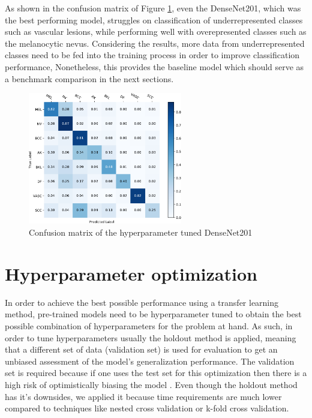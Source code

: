     As shown in the confusion matrix of Figure \ref{fig:densenet201_untuned_conf_matrix}, even the DenseNet201, which was the best performing model, struggles on classification of underrepresented classes such as vascular lesions, while performing well with overepresented classes such as the melanocytic nevus. Considering the results, more data from underrepresented classes need to be fed into the training process in order to improve classification performance, Nonetheless, this provides the baseline model which should serve as a benchmark comparison in the next sections. \par
    \begin{figure}[ht]
        \centering
        \includegraphics[width=0.6\textwidth]{figs/densenet201_untuned_conf_matrix.pdf}
        \caption{Confusion matrix of the hyperparameter tuned DenseNet201}
        \label{fig:densenet201_untuned_conf_matrix}
    \end{figure}

\section{Hyperparameter optimization} \label{section:hyperparameters}

    In order to achieve the best possible performance using a transfer learning method, pre-trained models need to be hyperparameter tuned to obtain the best possible combination of hyperparameters for the problem at hand.  As such, in order to tune hyperparameters usually the holdout method is applied, meaning that a different set of data (validation set) is used for evaluation to get an unbiased assessment of the model’s generalization performance. The validation set is required because if one uses the test set for this optimization then there is a high risk of optimistically biasing the model \cite{talbot}. Even though the holdout method has it's downsides, we applied it because time requirements are much lower compared to techniques like nested cross validation or k-fold cross validation. \par
    
